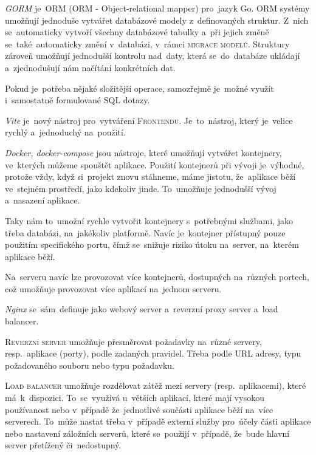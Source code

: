\documentclass[14pt,a4paper]{article}
\begin{document}
            \emph{GORM} je~ORM (ORM - Object-relational mapper) pro~jazyk Go. \textsc{ORM} systémy umožňují jednoduše vytvářet databázové modely z~definovaných struktur. 
            Z~nich se~automaticky vytvoří všechny databázové tabulky a~při jejich změně se~také~automaticky změní v~databázi, v~rámci \textsc{migrace modelů}.
            Struktury zároveň umožňují jednodušší kontrolu nad~daty, která se~do~databáze ukládají a~zjednodušují nám načítání konkrétních dat. \cite{freecodecamp:orm}

            Pokud je~potřeba nějaké složitější operace, samozřejmě je~možné využít i~samostatně formulované SQL dotazy. \cite{gormGORM}

            \emph{Vite} je~nový nástroj pro~vytváření \textsc{Frontendu}. Je~to~nástroj, který je~velice rychlý a~jednoduchý na~použití.

            \emph{Docker, docker-compose} jsou nástroje, které umožňují vytvářet kontejnery, ve~kterých můžeme spouštět aplikace.
            Použití kontejnerů při vývoji je~výhodné, protože vždy, když si~projekt znovu stáhneme, máme jistotu, že~aplikace běží
            ve~stejném prostředí, jako kdekoliv jinde. To~umožňuje jednodušší vývoj a~nasazení aplikace.

            Taky nám to~umožní rychle vytvořit kontejnery s~potřebnými službami, jako třeba databázi, na~jakékoliv platformě. Navíc je~kontejner přístupný pouze použitím specifického portu,
            čímž se~snižuje riziko útoku na~server, na~kterém aplikace běží. \cite{docker}

            Na~serveru navíc lze provozovat více kontejnerů, dostupných na~různých portech, což umožňuje provozovat více aplikací na~jednom serveru.

            \emph{Nginx} se~sám~definuje jako webový server a~reverzní proxy server a~load balancer.

            \textsc{Reverzní server} umožňuje přesměrovat požadavky na~různé servery, resp.~aplikace (porty), podle zadaných pravidel. Třeba podle URL adresy, typu požadovaného souboru nebo typu požadavku.
            
            \textsc{Load balancer} umožňuje rozdělovat zátěž mezi servery (resp.~aplikacemi), které má~k~dispozici. To~se~využívá u~větších aplikací, které mají vysokou používanost nebo v~případě že~jednotlivé součásti aplikace běží na~více serverech. To~může nastat třeba v~případě externí služby pro~účely části aplikace nebo nastavení záložních serverů, které se~použijí v~případě, že~bude hlavní server přetížený či~nedostupný.
            
\end{document}

